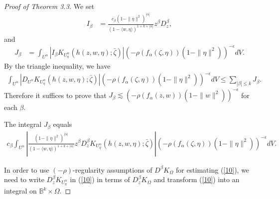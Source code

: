 \documentclass[reqno,12pt]{amsart}
\numberwithin{equation}{section}
\begin{document}
\begin{proof}[Proof of Theorem 3.3]
			We set
			\begin{align}
			I_\beta&=\frac{c_{\beta}(1-\|\eta\|^2)^{|\alpha|}}{(1- \langle w,\eta\rangle)^{1+k+|\alpha|}}z^{\beta}D^\beta_z,\nonumber
			\end{align}
			and
			\begin{align}\label{8}
			J_{\beta}&=\int_{U^{\alpha}}\left|I_\beta K_{U^{\alpha}_{\eta}}\left(h(z,w,\eta) ;\bar\zeta \right)\right|\left(-\rho\left(f_\alpha(\zeta,\eta) \right)(1-\|\eta\|^2)\right)^{-\epsilon}dV.
			\end{align}
			By the triangle inequality, we have
			{\begin{align}\label{9}
			\int_{U^{\alpha}}\left|D_{U^{\alpha}}K_{U^{\alpha}_{\eta}}\left(h(z,w,\eta) ;\bar\zeta \right)\right|\left(-\rho\left(f_\alpha(\zeta,\eta) \right)(1-\|\eta\|^2)\right)^{-\epsilon}dV\leq \sum_{|\beta|\leq k} J_{\beta}.
			\end{align}}
			Therefore it suffices to prove that $J_\beta\lesssim \left(-\rho\left(f_\alpha(z,w) \right)(1-\|w\|^2)\right)^{-\epsilon}$ for each $\beta$.
			
			The integral $J_\beta$ equals
			\begin{align}\label{10}
			c_\beta\int_{U^{\alpha}}\left|\frac{(1-\|\eta\|^2)^{|\alpha|}}{(1- \langle w,\eta\rangle)^{1+k+|\alpha|}}z^{\beta}D^\beta_z K_{U^{\alpha}_{\eta}}\left(h(z,w,\eta) ;\bar\zeta \right)\right|\left(-\rho\left(f_\alpha(\zeta,\eta) \right)(1-\|\eta\|^2)\right)^{-\epsilon}dV.
			\end{align}
		{	In order to use $(-\rho)$-regularity assumptions of $D^\beta K_\Omega$ for estimating (\ref{10}), we need to write $D^\beta_z K_{U^{\alpha}_{\eta}}$ in (\ref{10})  in terms of $D^\beta_z K_{\Omega}$ and transform (\ref{10}) into an integral on $\mathbb B^k\times \Omega$.
			
}
\end{proof}
\end{document}
